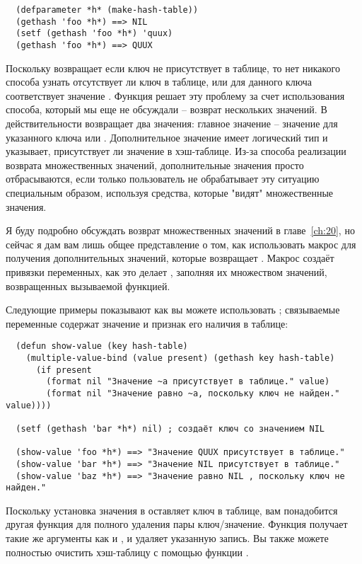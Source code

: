 \begin{verbatim}
  (defparameter *h* (make-hash-table))
  (gethash 'foo *h*) ==> NIL
  (setf (gethash 'foo *h*) 'quux)
  (gethash 'foo *h*) ==> QUUX
\end{verbatim}

Поскольку  возвращает  если ключ не присутствует в таблице, то нет
никакого способа узнать отсутствует ли ключ в таблице, или для данного ключа соответствует
значение .  Функция  решает эту проблему за счет использования
способа, который мы еще не обсуждали -- возврат нескольких значений.  В действительности
 возвращает два значения: главное значение -- значение для указанного ключа
или .  Дополнительное значение имеет логический тип и указывает, присутствует ли
значение в хэш-таблице.  Из-за способа реализации возврата множественных значений,
дополнительные значения просто отбрасываются, если только пользователь не обрабатывает эту
ситуацию специальным образом, используя средства, которые "видят" множественные значения.

Я буду подробно обсуждать возврат множественных значений в главе~\ref{ch:20}, но сейчас я
дам вам лишь общее представление о том, как использовать макрос 
для получения дополнительных значений, которые возвращает .  Макрос
 создаёт привязки переменных, как это делает ,
заполняя их множеством значений, возвращенных вызываемой функцией.

Следующие примеры показывают как вы можете использовать ;
связываемые переменные содержат значение и признак его наличия в таблице:

\begin{lstlisting}  
  (defun show-value (key hash-table)
    (multiple-value-bind (value present) (gethash key hash-table)
      (if present
        (format nil "Значение ~a присутствует в таблице." value)
        (format nil "Значение равно ~a, поскольку ключ не найден." value))))

  (setf (gethash 'bar *h*) nil) ; создаёт ключ со значением NIL

  (show-value 'foo *h*) ==> "Значение QUUX присутствует в таблице."
  (show-value 'bar *h*) ==> "Значение NIL присутствует в таблице."
  (show-value 'baz *h*) ==> "Значение равно NIL , поскольку ключ не найден."
\end{lstlisting}

Поскольку установка значения в  оставляет ключ в таблице, вам понадобится другая
функция для полного удаления пары ключ/значение.  Функция  получает такие же
аргументы как и , и удаляет указанную запись.  Вы также можете полностью
очистить хэш-таблицу с помощью функции .


